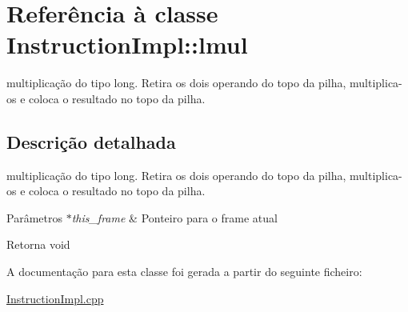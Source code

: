 \hypertarget{class_instruction_impl_1_1lmul}{}\section{Referência à classe Instruction\+Impl\+:\+:lmul}
\label{class_instruction_impl_1_1lmul}


multiplicação do tipo long. Retira os dois operando do topo da pilha, multiplica-\/os e coloca o resultado no topo da pilha.  




\subsection{Descrição detalhada}
multiplicação do tipo long. Retira os dois operando do topo da pilha, multiplica-\/os e coloca o resultado no topo da pilha. 


\begin{DoxyParams}{Parâmetros}
{\em $\ast$this\+\_\+frame} & Ponteiro para o frame atual \\
\hline
\end{DoxyParams}
\begin{DoxyReturn}{Retorna}
void 
\end{DoxyReturn}


A documentação para esta classe foi gerada a partir do seguinte ficheiro\+:\begin{DoxyCompactItemize}
\item 
\hyperlink{_instruction_impl_8cpp}{Instruction\+Impl.\+cpp}\end{DoxyCompactItemize}
